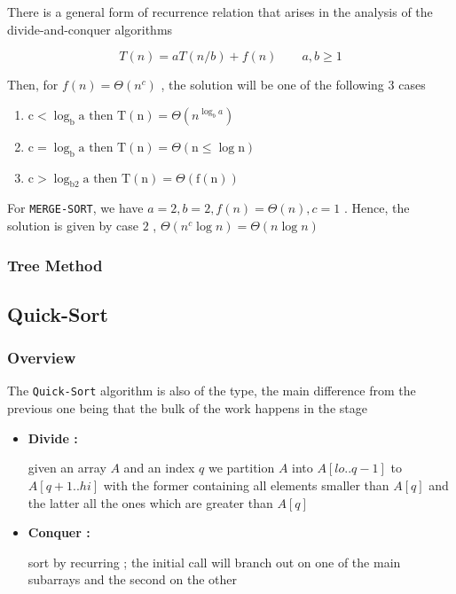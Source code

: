 	\par{There is a general form of recurrence relation that arises in the
analysis of the divide-and-conquer algorithms}

$$T(n) = aT(n/b) + f(n) \qquad a , b \geq 1$$

	\par{Then, for $f(n) = \Theta(n^c)$ , the solution will be one of the
following 3 cases}

	\begin{enumerate}
		\item $
\mathrm{c}<\log _{\mathrm{b}} \mathrm{a} \text { then } \mathrm{T}(\mathrm{n})=\Theta\left(n^{\log _{b} a}\right)
$
		\item $
\mathrm{c}=\log _{\mathrm{b}} \mathrm{a} \text { then } \mathrm{T}(\mathrm{n})=\Theta(\mathrm{n} \leq \log \mathrm{n})
$
		\item $
\mathrm{c}>\log _{\mathrm{b} 2} \mathrm{a} \text { then } \mathrm{T}(\mathrm{n})=\Theta(\mathrm{f}(\mathrm{n}))
$
	\end{enumerate}

\par{For \texttt{MERGE-SORT}, we have $a=2 , b=2 , f(n) = \Theta(n) , c = 1$ .
Hence, the solution is given by case $2$ , $\Theta(n^c \log n) = \Theta(n \log
n)$}

\subsubsection{Tree Method}



\subsection{Quick-Sort}

\subsubsection{Overview}

	\par{The \texttt{Quick-Sort} algorithm is also of the
			 type, the main difference from the previous
			one being that the bulk of the work happens in the 
	stage}


	\begin{itemize}
			\item\textbf{Divide : }\par{ given an array $A$ and an index $q$
							we partition $A$ into $A[lo..q-1]$ to $A[q+1..hi]$
							with the former containing all elements smaller than
							$A[q]$ and the latter all the ones which are greater
					than $A[q]$}
			\item\textbf{Conquer :}\par{sort by recurring ; the initial call
							will branch out on one of the main subarrays and the
					second on the other}

	\end{itemize}

